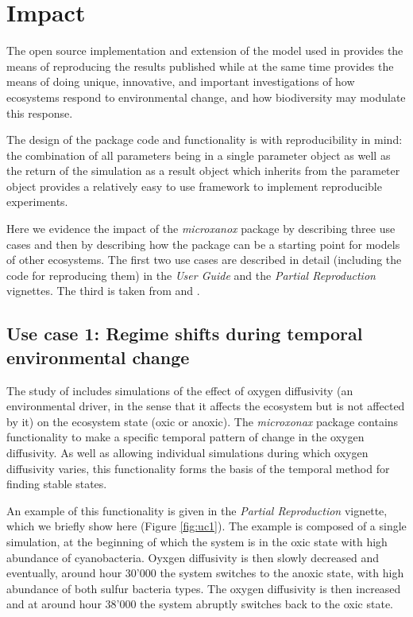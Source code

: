 \documentclass[preprint,12pt, a4paper]{elsarticle}
\begin{document}
\hypertarget{impact}{%
\section{Impact}\label{impact}}

The open source implementation and extension of the model used in
\citet{Bush2017} provides the means of reproducing the results published
while at the same time provides the means of doing unique, innovative,
and important investigations of how ecosystems respond to environmental
change, and how biodiversity may modulate this response.

The design of the package code and functionality is with reproducibility
in mind: the combination of all parameters being in a single parameter
object as well as the return of the simulation as a result object which
inherits from the parameter object provides a relatively easy to use
framework to implement reproducible experiments.

Here we evidence the impact of the \emph{microxanox} package by
describing three use cases and then by describing how the package can be
a starting point for models of other ecosystems. The first two use cases
are described in detail (including the code for reproducing them) in the
\emph{User Guide} and the \emph{Partial Reproduction} vignettes. The
third is taken from \citet{Limberger2022} and \citet{Petchey2022}.

\hypertarget{use-case-1-regime-shifts-during-temporal-environmental-change}{%
\subsection{Use case 1: Regime shifts during temporal environmental
change}\label{use-case-1-regime-shifts-during-temporal-environmental-change}}

The study of \citet{Bush2017} includes simulations of the effect of
oxygen diffusivity (an environmental driver, in the sense that it
affects the ecosystem but is not affected by it) on the ecosystem state
(oxic or anoxic). The \emph{microxonax} package contains functionality
to make a specific temporal pattern of change in the oxygen diffusivity.
As well as allowing individual simulations during which oxygen
diffusivity varies, this functionality forms the basis of the temporal
method for finding stable states.

An example of this functionality is given in the \emph{Partial
Reproduction} vignette, which we briefly show here (Figure
\ref{fig:uc1}). The example is composed of a single simulation, at the
beginning of which the system is in the oxic state with high abundance
of cyanobacteria. Oyxgen diffusivity is then slowly decreased and
eventually, around hour 30'000 the system switches to the anoxic state,
with high abundance of both sulfur bacteria types. The oxygen
diffusivity is then increased and at around hour 38'000 the system
abruptly switches back to the oxic state.
\end{document}
